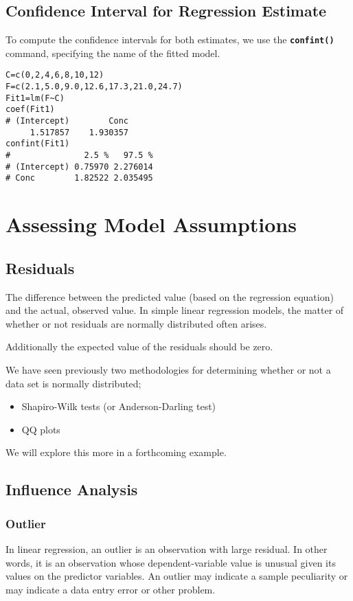 \subsection{Confidence Interval for Regression Estimate}
To compute the confidence intervals for both estimates, we use the \texttt\textbf{{confint()}} command, specifying the name of the fitted model.
\begin{framed}
\begin{verbatim}
C=c(0,2,4,6,8,10,12)
F=c(2.1,5.0,9.0,12.6,17.3,21.0,24.7)
Fit1=lm(F~C)
coef(Fit1)
# (Intercept)        Conc
     1.517857    1.930357
confint(Fit1)
#               2.5 %   97.5 %
# (Intercept) 0.75970 2.276014
# Conc        1.82522 2.035495
\end{verbatim}
\end{framed}

\section{Assessing Model Assumptions}
\subsection{Residuals}  The difference between the predicted value (based on the regression equation) and the actual, observed value. In simple linear regression models, the matter of whether or not residuals are normally distributed often arises.

Additionally the expected value of the residuals should be zero.

We have seen previously two methodologies for determining whether or not a data set is normally distributed;

\begin{itemize} \item 	Shapiro-Wilk tests (or Anderson-Darling test)
\item 	QQ plots
\end{itemize}

We will explore this more in a forthcoming example.
\subsection{Influence Analysis}


\subsubsection{Outlier} In linear regression, an outlier is an observation with large residual.  In other words, it is an observation whose dependent-variable value is unusual given its values on the predictor variables.  An outlier may indicate a sample peculiarity or may indicate a data entry error or other problem.
